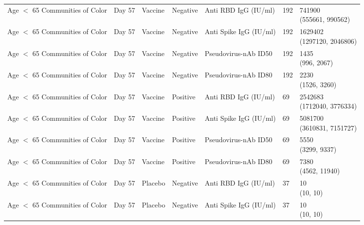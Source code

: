 \documentclass[]{book}
\theoremstyle{definition}
\theoremstyle{definition}
\theoremstyle{definition}
\newcommand{\1}{\mathbbm{1}}
\begin{document}
\begin{landscape}
\begin{ThreePartTable}
\begin{longtable}[t]{>{\raggedright\arraybackslash}p{7cm}llllll}
\hspace{1em}Age $<$ 65 Communities of Color & Day 57 & Vaccine & Negative & Anti RBD IgG (IU/ml) & 192 & \makecell[l]{741900\\(555661, 990562)}\\
\hspace{1em}Age $<$ 65 Communities of Color & Day 57 & Vaccine & Negative & Anti Spike IgG (IU/ml) & 192 & \makecell[l]{1629402\\(1297120, 2046806)}\\
\hspace{1em}Age $<$ 65 Communities of Color & Day 57 & Vaccine & Negative & Pseudovirus-nAb ID50 & 192 & \makecell[l]{1435\\(996, 2067)}\\
\hspace{1em}Age $<$ 65 Communities of Color & Day 57 & Vaccine & Negative & Pseudovirus-nAb ID80 & 192 & \makecell[l]{2230\\(1526, 3260)}\\
\hspace{1em}Age $<$ 65 Communities of Color & Day 57 & Vaccine & Positive & Anti RBD IgG (IU/ml) & 69 & \makecell[l]{2542683\\(1712040, 3776334)}\\
\hspace{1em}Age $<$ 65 Communities of Color & Day 57 & Vaccine & Positive & Anti Spike IgG (IU/ml) & 69 & \makecell[l]{5081700\\(3610831, 7151727)}\\
\hspace{1em}Age $<$ 65 Communities of Color & Day 57 & Vaccine & Positive & Pseudovirus-nAb ID50 & 69 & \makecell[l]{5550\\(3299, 9337)}\\
\hspace{1em}Age $<$ 65 Communities of Color & Day 57 & Vaccine & Positive & Pseudovirus-nAb ID80 & 69 & \makecell[l]{7380\\(4562, 11940)}\\
\hspace{1em}Age $<$ 65 Communities of Color & Day 57 & Placebo & Negative & Anti RBD IgG (IU/ml) & 37 & \makecell[l]{10\\(10, 10)}\\
\hspace{1em}Age $<$ 65 Communities of Color & Day 57 & Placebo & Negative & Anti Spike IgG (IU/ml) & 37 & \makecell[l]{10\\(10, 10)}\\

\end{longtable}
\end{ThreePartTable}
\end{landscape}
\end{document}

